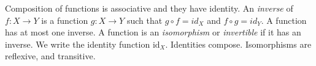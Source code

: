  Composition of functions is associative and they have identity.
 An \textit{inverse} of $f \colon X \to Y$ is a function $g \colon X \to Y$ such that $g \circ f = id_X$ and $f \circ g = id_Y$.
 A function has at most one inverse.
 A function is an \textit{isomorphism} or \textit{invertible} if it has an inverse.
 We write the identity function $\text{id}_X$. Identities compose.
 Isomorphisms are reflexive, and transitive.
